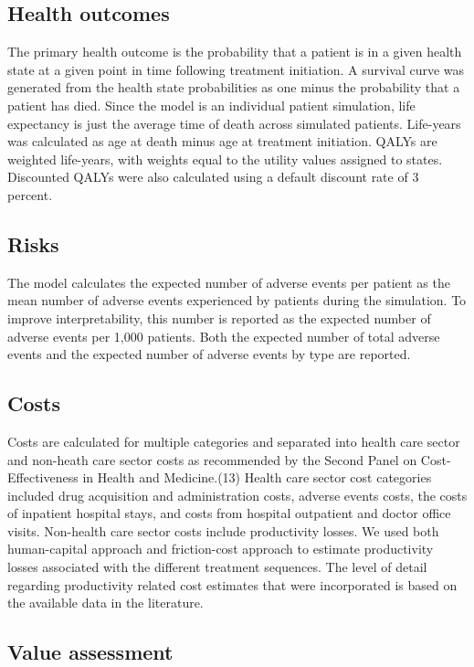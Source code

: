 \documentclass[11pt,final,fleqn]{article}\usepackage[]{graphicx}\usepackage[]{color}
\theoremstyle{plain}
\begin{document}
{\subsection{Health outcomes}

The primary health outcome is the probability that a patient is in a given health state at a given point in time following treatment initiation. A survival curve was generated from the health state probabilities as one minus the probability that a patient has died. Since the model is an individual patient simulation, life expectancy is just the average time of death across simulated patients. Life-years was calculated as age at death minus age at treatment initiation. QALYs are weighted life-years, with weights equal to the utility values assigned to states.  Discounted QALYs were also calculated using a default discount rate of 3 percent.

\subsection{Risks}

The model calculates the expected number of adverse events per patient as the mean number of adverse events experienced by patients during the simulation. To improve interpretability, this number is reported as the expected number of adverse events per 1,000 patients. Both the expected number of total adverse events and the expected number of adverse events by type are reported.

\subsection{Costs} 

Costs are calculated for multiple categories and separated into health care sector and non-heath care sector costs as recommended by the Second Panel on Cost-Effectiveness in Health and Medicine.(13) Health care sector cost categories included drug acquisition and administration costs, adverse events costs, the costs of inpatient hospital stays, and costs from hospital outpatient and doctor office visits. Non-health care sector costs include productivity losses. We used both human-capital approach and friction-cost approach to estimate productivity losses associated with the different treatment sequences. The level of detail regarding productivity related cost estimates that were incorporated is based on the available data in the literature.

\subsection{Value assessment} 

}
\end{document}
